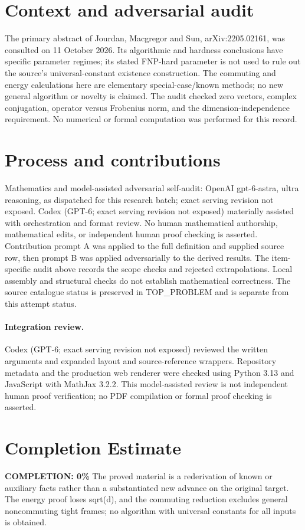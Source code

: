 \documentclass[11pt]{article}
\begin{document}
\section{Context and adversarial audit}
The primary abstract of Jourdan, Macgregor and Sun, arXiv:2205.02161, was
consulted on 11 October 2026. Its algorithmic and hardness conclusions have
specific parameter regimes; its stated FNP-hard parameter is not used to
rule out the source's universal-constant existence construction. The
commuting and energy calculations here are elementary special-case/known
methods; no new general algorithm or novelty is claimed. The audit checked
zero vectors, complex conjugation, operator versus Frobenius norm, and the
dimension-independence requirement. No numerical or formal computation was
performed for this record.

\section{Process and contributions}
Mathematics and model-assisted adversarial self-audit: OpenAI gpt-6-astra, ultra reasoning, as dispatched for this research batch; exact serving revision not exposed. Codex (GPT-6; exact serving revision not exposed) materially assisted with orchestration and format review. No human mathematical authorship, mathematical edits, or independent human proof checking is asserted.
Contribution prompt A was applied to the full definition and supplied source row, then prompt B was applied adversarially to the derived results. The item-specific audit above records the scope checks and rejected extrapolations. Local assembly and structural checks do not establish mathematical correctness. The source catalogue status is preserved in TOP\_PROBLEM and is separate from this attempt status.
\paragraph{Integration review.} Codex (GPT-6; exact serving revision not exposed) reviewed the written arguments and expanded layout and source-reference wrappers. Repository metadata and the production web renderer were checked using Python 3.13 and JavaScript with MathJax 3.2.2. This model-assisted review is not independent human proof verification; no PDF compilation or formal proof checking is asserted.

\section{Completion Estimate}
\noindent\textbf{COMPLETION: 0\%}
The proved material is a rederivation of known or auxiliary facts rather than a substantiated new advance on the original target. The energy proof loses sqrt(d), and the commuting reduction excludes general noncommuting tight frames; no algorithm with universal constants for all inputs is obtained.
\end{document}
